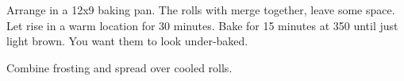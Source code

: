 \begin{recipe}
Arrange in a 12x9 baking pan. The rolls with merge together, leave some space. 
Let rise in a warm location for 30 minutes. 
Bake for 15 minutes at 350\degree{} until just light brown. 
You want them to look under-baked.


Combine frosting and spread over cooled rolls. 

\end{recipe}
